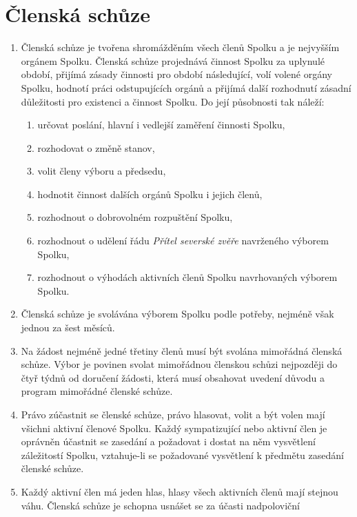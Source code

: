 \documentclass[11pt,a4paper]{article}
\begin{document}
\section{Členská schůze}
\begin{enumerate}[itemsep=0pt]
    \item Členská schůze je tvořena shromážděním všech členů Spolku a je 
    nejvyšším orgánem Spolku. Členská schůze projednává činnost Spolku 
    za uplynulé období, přijímá zásady činnosti pro období následující, 
    volí volené orgány Spolku, hodnotí práci odstupujících orgánů a přijímá 
    další rozhodnutí zásadní důležitosti pro existenci a činnost Spolku. 
    Do její působnosti tak náleží: 
    \begin{enumerate}[itemsep=0pt,topsep=0pt]
        \item určovat poslání, hlavní i vedlejší zaměření činnosti Spolku,
        \item rozhodovat o změně stanov,
        \item volit členy výboru a předsedu,
        \item hodnotit činnost dalších orgánů Spolku i jejich členů,
        \item rozhodnout o dobrovolném rozpuštění Spolku,
        \item rozhodnout o udělení řádu \textit{Přítel severské zvěře} navrženého výborem Spolku,
        \item rozhodnout o výhodách aktivních členů Spolku navrhovaných výborem Spolku. 
    \end{enumerate}
    \item Členská schůze je svolávána výborem Spolku podle potřeby, nejméně 
    však jednou za šest měsíců.
    \item Na žádost nejméně jedné třetiny členů musí být svolána mimořádná 
    členská schůze. Výbor je povinen svolat mimořádnou členskou schůzi 
    nejpozději do čtyř týdnů od doručení žádosti, která musí obsahovat uvedení 
    důvodu a program mimořádné členské schůze.
    \item Právo zúčastnit se členské schůze, právo hlasovat, volit a být volen 
    mají všichni aktivní členové Spolku. Každý sympatizující nebo aktivní člen 
    je oprávněn účastnit se zasedání a požadovat i dostat na něm vysvětlení 
    záležitostí Spolku, vztahuje-li se požadované vysvětlení k předmětu zasedání
    členské schůze.
    \item Každý aktivní člen má jeden hlas, hlasy všech aktivních členů mají 
    stejnou váhu. Členská schůze je schopna usnášet se za účasti nadpoloviční 

\end{enumerate}
\end{document}
